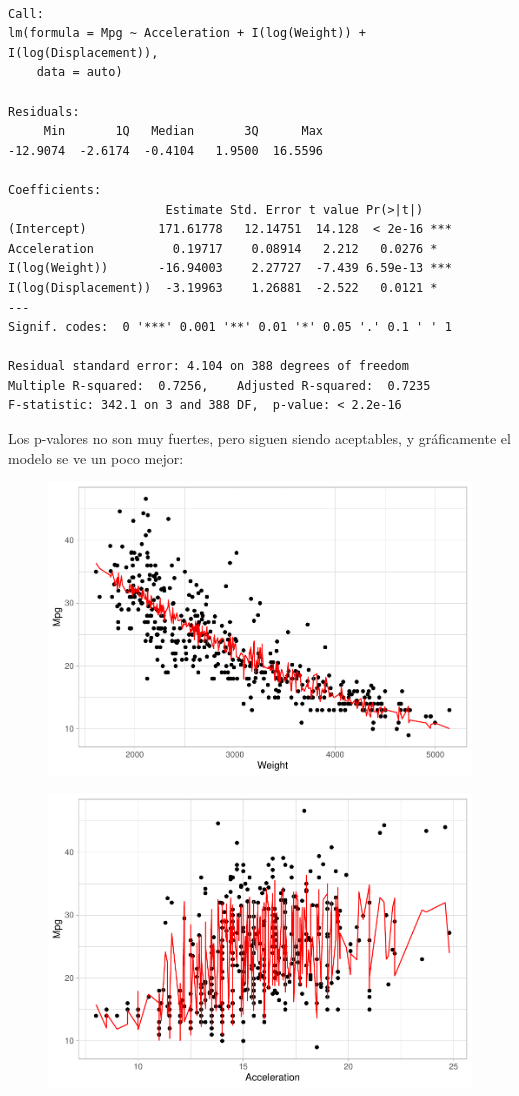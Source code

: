 \begin{verbatim}

Call:
lm(formula = Mpg ~ Acceleration + I(log(Weight)) + I(log(Displacement)), 
    data = auto)

Residuals:
     Min       1Q   Median       3Q      Max 
-12.9074  -2.6174  -0.4104   1.9500  16.5596 

Coefficients:
                      Estimate Std. Error t value Pr(>|t|)    
(Intercept)          171.61778   12.14751  14.128  < 2e-16 ***
Acceleration           0.19717    0.08914   2.212   0.0276 *  
I(log(Weight))       -16.94003    2.27727  -7.439 6.59e-13 ***
I(log(Displacement))  -3.19963    1.26881  -2.522   0.0121 *  
---
Signif. codes:  0 '***' 0.001 '**' 0.01 '*' 0.05 '.' 0.1 ' ' 1

Residual standard error: 4.104 on 388 degrees of freedom
Multiple R-squared:  0.7256,    Adjusted R-squared:  0.7235 
F-statistic: 342.1 on 3 and 388 DF,  p-value: < 2.2e-16
\end{verbatim}

Los p-valores no son muy fuertes, pero siguen siendo aceptables, y gráficamente el modelo se ve un poco mejor:

\begin{figure}[H]\includegraphics[width=.9\linewidth]{img/Regresion_files/figure-latex/unnamed-chunk-26-1} \caption{}\end{figure}

\begin{figure}[H]\includegraphics[width=.9\linewidth]{img/Regresion_files/figure-latex/unnamed-chunk-26-2} \caption{}\end{figure}

